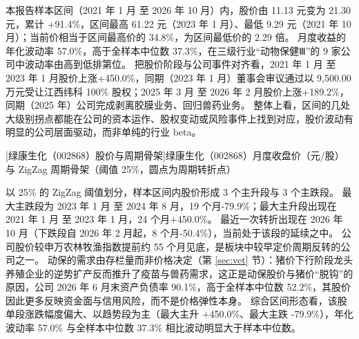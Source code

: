  本报告样本区间（2021 年 1 月 至 2026 年 10 月）内，股价由 11.13 元变为 21.30 元，累计 +91.4\%，区间最高 61.22 元（2023 年 1 月）、最低 9.29 元（2021 年 10 月）；当前价相当于区间最高价的 34.8\%，为区间最低价的 2.29 倍。 月度收益的年化波动率 57.0\%，高于全样本中位数 37.3\%，在三级行业“动物保健Ⅲ”的 9 家公司中波动率由高到低排第位。 把股价阶段与公司事件对齐看，2021 年 1 月 至 2023 年 1 月股价上涨+450.0\%，同期（2023 年 1 月）董事会审议通过以 9,500.00 万元受让江西纬科 100\% 股权；2025 年 3 月 至 2026 年 2 月股价上涨+189.2\%，同期（2025 年）公司完成剥离胶膜业务、回归兽药业务。 整体上看，区间的几处大级别拐点都能在公司的资本运作、股权变动或风险事件上找到对应，股价波动有明显的公司层面驱动，而非单纯的行业 beta。

\begin{center}
\begin{minipage}{\textwidth}\centering
{}

[绿康生化（002868）股价与周期骨架]{绿康生化（002868）月度收盘价（元/股）与 ZigZag 周期骨架（阈值 25\%，圆点为周期转折点）}
\end{minipage}
\end{center}

 以 25\% 的 ZigZag 阈值划分，样本区间内股价形成 3 个主升段与 3 个主跌段。 最大主跌段为 2023 年 1 月 至 2024 年 8 月，19 个月-79.9\%；最大主升段出现在 2021 年 1 月 至 2023 年 1 月，24 个月+450.0\%。 最近一次转折出现在 2026 年 10 月（下跌段自 2026 年 2 月起，8 个月-50.4\%），当前处于该段的延续之中。 公司股价较申万农林牧渔指数提前约 55 个月见底，是板块中较早定价周期反转的公司之一。 动保的需求由存栏量而非价格决定（第 \ref{sec:vet} 节）：猪价下行阶段龙头养殖企业的逆势扩产反而推升了疫苗与兽药需求，这正是动保股价与猪价“脱钩”的原因，公司 2026 年 6 月末资产负债率 90.1\%，高于全样本中位数 52.2\%，其股价因此更多反映资金面与信用风险，而不是价格弹性本身。 综合区间形态看，该股单段涨跌幅度偏大、以趋势段为主（最大主升 +450.0\%、最大主跌 -79.9\%），年化波动率 57.0\% 与全样本中位数 37.3\% 相比波动明显大于样本中位数。

